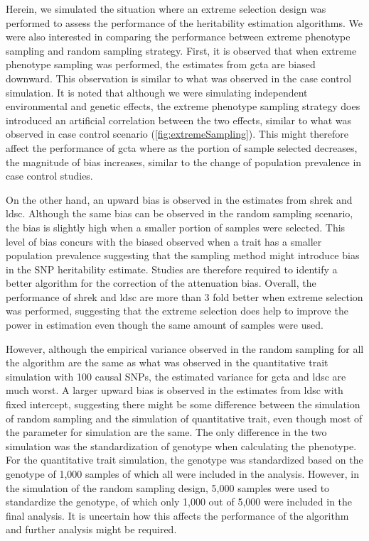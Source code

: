 \documentclass[12pt]{scrbook}
\begin{document}
Herein, we simulated the situation where an extreme selection design was performed to assess the performance of the heritability estimation algorithms.
We were also interested in comparing the performance between extreme phenotype sampling and random sampling strategy.
First, it is observed that when extreme phenotype sampling was performed, the estimates from \gls{gcta} are biased downward. 
This observation is similar to what was observed in the case control simulation.
It is noted that although we were simulating independent environmental and genetic effects, the extreme phenotype sampling strategy does introduced an artificial correlation between the two effects, similar to what was observed in case control scenario (\cref{fig:extremeSampling}).
This might therefore affect the performance of \gls{gcta} where as the portion of sample selected decreases, the magnitude of bias increases, similar to the change of population prevalence in case control studies. 

On the other hand, an upward bias is observed in the estimates from \gls{shrek} and \gls{ldsc}.
Although the same bias can be observed in the random sampling scenario, the bias is slightly high when a smaller portion of samples were selected.
This level of bias concurs with the biased observed when a trait has a smaller population prevalence suggesting that the sampling method might introduce bias in the \gls{SNP} heritability estimate.
Studies are therefore required to identify a better algorithm for the correction of the attenuation bias. 
Overall, the performance of \gls{shrek} and \gls{ldsc} are more than 3 fold better when extreme selection was performed, suggesting that the extreme selection does help to improve the power in estimation even though the same amount of samples were used.

However, although the empirical variance observed in the random sampling for all the algorithm are the same as what was observed in the quantitative trait simulation with 100 causal \glspl{SNP}, the estimated variance for \gls{gcta} and \gls{ldsc} are much worst.
A larger upward bias is observed in the estimates from \gls{ldsc} with fixed intercept, suggesting there might be some difference between the simulation of random sampling and the simulation of quantitative trait, even though most of the parameter for simulation are the same.
The only difference in the two simulation was the standardization of genotype when calculating the phenotype.
For the quantitative trait simulation, the genotype was standardized based on the genotype of 1,000 samples of which all were included in the analysis. 
However, in the simulation of the random sampling design, 5,000 samples were used to standardize the genotype, of which only 1,000 out of 5,000 were included in the final analysis.
It is uncertain how this affects the performance of the algorithm and further analysis might be required.
\end{document}
